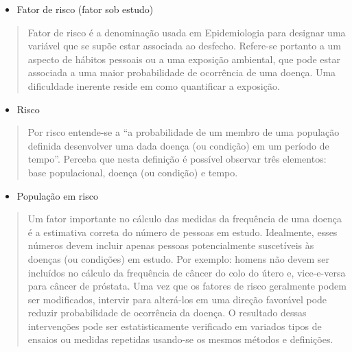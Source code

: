 \documentclass[
]{book}
\providecommand{\tightlist}{%
  \setlength{\itemsep}{0pt}\setlength{\parskip}{0pt}}
\begin{document}
\hfill\break

\begin{itemize}
\tightlist
\item
  Fator de risco (fator sob estudo)
\end{itemize}

\hfill\break

\begin{quote}
Fator de risco é a denominação usada em Epidemiologia para designar uma variável que se supõe estar associada ao desfecho. Refere-se portanto a um aspecto de hábitos pessoais ou a uma exposição ambiental, que pode estar associada a uma maior probabilidade de ocorrência de uma doença. Uma dificuldade inerente reside em como quantificar a exposição.
\end{quote}

\hfill\break

\begin{itemize}
\tightlist
\item
  Risco
\end{itemize}

\hfill\break

\begin{quote}
Por risco entende-se a ``a probabilidade de um membro de uma população definida desenvolver uma dada doença (ou condição) em um período de tempo''. Perceba que nesta definição é possível observar três elementos: base populacional, doença (ou condição) e tempo.
\end{quote}

\hfill\break

\begin{itemize}
\tightlist
\item
  População em risco
\end{itemize}

\hfill\break

\begin{quote}
Um fator importante no cálculo das medidas da frequência de uma doença é a estimativa correta do número de pessoas em estudo. Idealmente, esses números devem incluir apenas pessoas potencialmente suscetíveis às doenças (ou condições) em estudo. Por exemplo: homens não devem ser incluídos no cálculo da frequência de câncer do colo do útero e, vice-e-versa para câncer de próstata. Uma vez que os fatores de risco geralmente podem ser modificados, intervir para alterá-los em uma direção favorável pode reduzir probabilidade de ocorrência da doença. O resultado dessas intervenções pode ser estatisticamente verificado em variados tipos de ensaios ou medidas repetidas usando-se os mesmos métodos e definições.
\end{quote}
\end{document}
